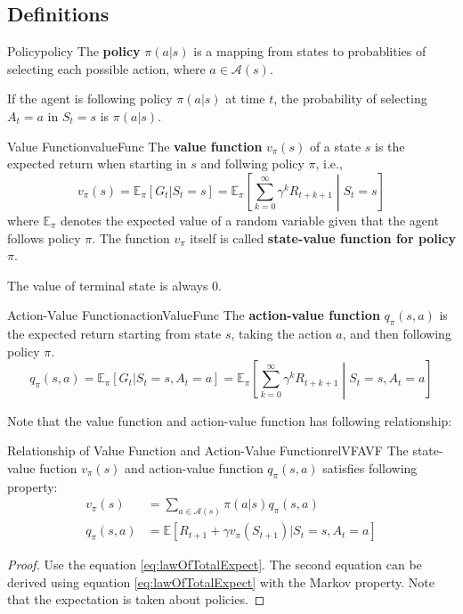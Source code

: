 \documentclass[../../main.tex]{subfiles}
\begin{document}
    \subsection{Definitions}
        \begin{defn}{Policy}{policy}
            The \textbf{policy} $\pi(a|s)$ is a mapping from states to probablities of selecting each possible action, where $a \in \mathcal{A}(s)$.
        \end{defn}
        If the agent is following policy $\pi(a|s)$ at time $t$, the probability of selecting $A_t = a$ in $S_t=s$ is $\pi(a|s)$.
        \begin{defn}{Value Function}{valueFunc}
            The \textbf{value function} $v_\pi(s)$ of a state $s$ is the expected return when starting in $s$ and follwing policy $\pi$, i.e.,
            \[
            v_\pi(s) = \mathbb{E}_\pi[G_t|S_t=s] = \mathbb{E}_\pi\left[ \sum_{k=0}^{\infty}\gamma^kR_{t+k+1}\middle|S_t=s \right]
            \]
            where $\mathbb{E}_\pi$ denotes the expected value of a random variable given that the agent follows policy $\pi$.
            The function $v_\pi$ itself is called \textbf{state-value function for policy} $\pi$.
        \end{defn}
        The value of terminal state is always 0.
        \begin{defn}{Action-Value Function}{actionValueFunc}
            The \textbf{action-value function} $q_\pi(s,a)$ is the expected return starting from state $s$, taking the action $a$,
            and then following policy $\pi$.
            \[
            q_\pi(s,a) = \mathbb{E}_\pi[G_t|S_t=s,A_t=a] = \mathbb{E}_\pi\left[ \sum_{k=0}^{\infty}\gamma^kR_{t+k+1}\middle|S_t=s,A_t=a \right]
            \]
        \end{defn}
        Note that the value function and action-value function has following relationship:
        \begin{thm}{Relationship of Value Function and Action-Value Function}{relVFAVF}
            The state-value fuction $v_\pi(s)$ and action-value function $q_\pi(s,a)$ satisfies following property:
            \begin{align*}
            v_\pi(s) &= \sum_{a \in \mathcal{A}(s)}\pi(a|s)q_\pi(s,a) \\
            q_\pi(s,a) &= \mathbb{E}[R_{t+1} + \gamma v_\pi(S_{t+1})|S_t=s,A_t=a]
            \end{align*}
            
        \end{thm}
        \begin{proof}
            Use the equation \ref{eq:lawOfTotalExpect}. The second equation can be derived using equation \ref{eq:lawOfTotalExpect} with the Markov property. Note that the expectation is taken about policies.
        \end{proof}
\end{document}
